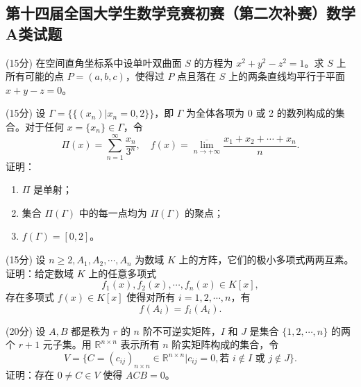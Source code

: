 \documentclass[loose]{ExBook}
\begin{document}
\subsection{第十四届全国大学生数学竞赛初赛（第二次补赛）数学A类试题}
\begin{qitems}

    \begin{bbox}
        \qitem (15分) 在空间直角坐标系中设单叶双曲面 \( S \) 的方程为 \( x^2 + y^2 - z^2 = 1 \)。求 \( S \) 上所有可能的点 \( P = (a, b, c) \)，使得过 \( P \) 点且落在 \( S \) 上的两条直线均平行于平面 \( x + y - z = 0 \)。
    \end{bbox}

    \begin{bbox}
        \qitem (15分) 设 \(\Gamma = \{ \{(x_n) | x_n = 0, 2\} \}\)，即 \(\Gamma\) 为全体各项为 0 或 2 的数列构成的集合。对于任何 \( x = \{x_n\} \in \Gamma \)，令
        \[
        \Pi(x) = \sum_{n=1}^{\infty} \frac{x_n}{3^n}, \quad f(x) = \overline{\lim_{n \to +\infty}} \frac{x_1 + x_2 + \cdots + x_n}{n}.
        \]
        证明：
        \begin{enumerate}[label=(\arabic*)]
            \item \(\Pi\) 是单射；
            \item 集合 \(\Pi(\Gamma)\) 中的每一点均为 \(\Pi(\Gamma)\) 的聚点；
            \item \(f(\Gamma) = [0, 2]\)。
        \end{enumerate}
    \end{bbox}

    \begin{bbox}
        \qitem (15分) 设 \( n \geq 2, A_1, A_2, \cdots, A_n \) 为数域 \( K \) 上的方阵，它们的极小多项式两两互素。证明：给定数域 \( K \) 上的任意多项式
        \[
        f_1(x), f_2(x), \cdots, f_n(x) \in K[x],
        \]
        存在多项式 \( f(x) \in K[x] \) 使得对所有 \( i = 1, 2, \cdots, n \)，有
        \[
        f(A_i) = f_i(A_i).
        \]
    \end{bbox}

    \begin{bbox}
        \qitem (20分) 设 \( A, B \) 都是秩为 \( r \) 的 \( n \) 阶不可逆实矩阵，\( I \) 和 \( J \) 是集合 \(\{1, 2, \cdots, n\}\) 的两个 \( r+1 \) 元子集。用 \(\mathbb{R}^{n \times n}\) 表示所有 \( n \) 阶实矩阵构成的集合，令
        \[
        V = \{C = (c_{ij})_{n \times n} \in \mathbb{R}^{n \times n} | c_{ij} = 0, \text{若 } i \not\in I \text{ 或 } j \not\in J\}.
        \]
        证明：存在 \( 0 \neq C \in V \) 使得 \( ACB = 0 \)。
    \end{bbox}


\end{qitems}
\end{document}
